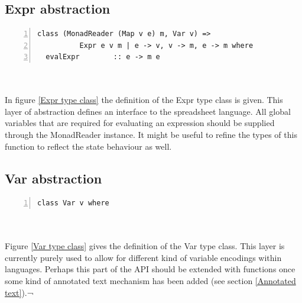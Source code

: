 \documentclass[10pt,a4paper]{article}
\begin{document}
\subsection{Expr abstraction}
\label{Expr abstraction}
\begin{minipage}{\linewidth}
\begin{Verbatim}[numbers=left,stepnumber=1,numbersep=5pt]
class (MonadReader (Map v e) m, Var v) =>
          Expr e v m | e -> v, v -> m, e -> m where
  evalExpr        :: e -> m e
\end{Verbatim}
\label{Expr type class}
\end{minipage}
\\\\
In figure \ref{Expr type class} the definition of the Expr type class is given. This layer
of abstraction defines an interface to the spreadsheet language. All global variables that are
required for evaluating an expression should be supplied through the MonadReader instance.
It might be useful to refine the types of this function to reflect the state behaviour as well.

\subsection{Var abstraction}
\label{Var abstraction}
\begin{minipage}{\linewidth}
\begin{Verbatim}[numbers=left,stepnumber=1,numbersep=5pt]
class Var v where
\end{Verbatim}
\label{Var type class}
\end{minipage}
\\\\
Figure \ref{Var type class} gives the definition of the Var type class.
This layer is currently purely used to allow for different kind of variable encodings within
languages. Perhaps this part of the API should be extended with functions once some kind of
annotated text mechanism has been added (see section \ref{Annotated text}).¬
\end{document}
